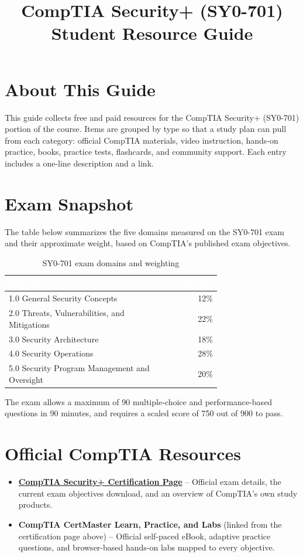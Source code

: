 \documentclass[11pt,letterpaper]{article}
\title{\color{navy}\textbf{CompTIA Security+ (SY0-701)\\Student Resource Guide}}
\date{}
\author{}
\begin{document}
\maketitle
\thispagestyle{fancy}

\section*{About This Guide}
This guide collects free and paid resources for the CompTIA Security+ (SY0-701) portion of the course. Items are grouped by type so that a study plan can pull from each category: official CompTIA materials, video instruction, hands-on practice, books, practice tests, flashcards, and community support. Each entry includes a one-line description and a link.

\section{Exam Snapshot}
The table below summarizes the five domains measured on the SY0-701 exam and their approximate weight, based on CompTIA's published exam objectives.

\begin{table}[htbp]
\centering
\caption{SY0-701 exam domains and weighting}
\begin{tabular}{@{}p{0.72\linewidth}r@{}}
\toprule
\rowcolor{navy}
\textcolor{white}{\textbf{Domain}} & \textcolor{white}{\textbf{Weight}} \\
\midrule
1.0 General Security Concepts & 12\% \\
\rowcolor{lightrow} 2.0 Threats, Vulnerabilities, and Mitigations & 22\% \\
3.0 Security Architecture & 18\% \\
\rowcolor{lightrow} 4.0 Security Operations & 28\% \\
5.0 Security Program Management and Oversight & 20\% \\
\bottomrule
\end{tabular}
\end{table}

The exam allows a maximum of 90 multiple-choice and performance-based questions in 90 minutes, and requires a scaled score of 750 out of 900 to pass.

\section{Official CompTIA Resources}
\begin{itemize}
\item \textbf{\href{https://www.comptia.org/en/certifications/security/}{CompTIA Security+ Certification Page}} -- Official exam details, the current exam objectives download, and an overview of CompTIA's own study products.
\item \textbf{CompTIA CertMaster Learn, Practice, and Labs} (linked from the certification page above) -- Official self-paced eBook, adaptive practice questions, and browser-based hands-on labs mapped to every objective.
\end{itemize}
\end{document}

